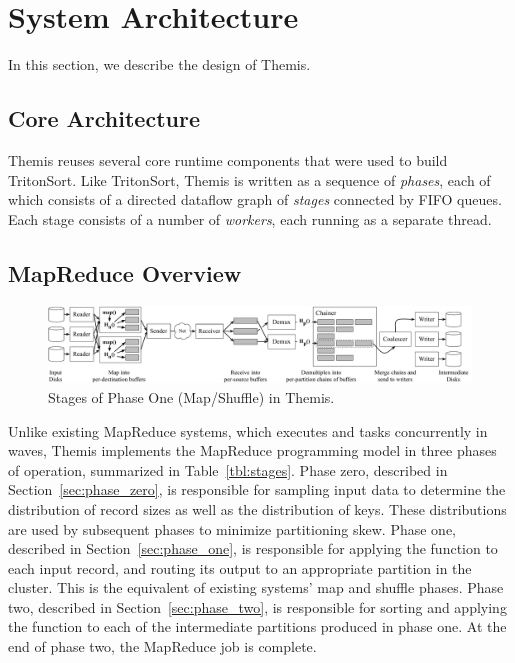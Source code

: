 \section{System Architecture}
\label{themis:sec:design}

In this section, we describe the design of Themis.

\subsection{Core Architecture}
\label{sec:overview}

Themis reuses several core runtime components that were used to build
TritonSort.  Like TritonSort, Themis is written as a sequence of
\emph{phases}, each of which consists of a directed dataflow graph of
\emph{stages} connected by FIFO queues.  Each stage consists of a number of
\emph{workers}, each running as a separate thread.

\subsection{MapReduce Overview}

\begin{figure}
\centering
\includegraphics[width=\textwidth]{themis/figures/detailed_phase_one.pdf}
\caption{\label{themis:fig:phase_one} Stages of Phase One (Map/Shuffle) in Themis.}
\end{figure}

Unlike existing MapReduce systems, which executes \map and \reduce tasks
concurrently in waves, Themis implements the MapReduce programming model in
three phases of operation, summarized in Table~\ref{tbl:stages}.  Phase zero,
described in Section~\ref{sec:phase_zero}, is responsible for sampling input
data to determine the distribution of record sizes as well as the distribution
of keys.  These distributions are used by subsequent phases to minimize
partitioning skew.  Phase one, described in Section~\ref{sec:phase_one}, is
responsible for applying the \map function to each input record, and routing
its output to an appropriate partition in the cluster.  This is the equivalent
of existing systems' map and shuffle phases.  Phase two, described in
Section~\ref{sec:phase_two}, is responsible for sorting and applying the
\reduce function to each of the intermediate partitions produced in phase one.
At the end of phase two, the MapReduce job is complete.

